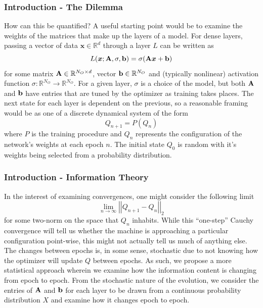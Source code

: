 \documentclass[11pt,aspectratio=169]{beamer}
\newcommand{\norm}[1]{\left|\left|#1\right|\right|}
\newcommand{\R}{\mathbb{R}}
\begin{document}
    \begin{frame}
        \frametitle{Introduction - The Dilemma}
        How can this be quantified? A useful starting point would be to examine the weights of
        the matrices that make up the layers of a model. For dense layers, passing a vector of 
        data $\boldsymbol{x} \in \R^{d}$ through a layer $L$ can be written as 
        \begin{equation}
            L(\boldsymbol{x}; {\bf A}, \sigma, {\bf b}) = \sigma({\bf A}\boldsymbol{x} + {\bf b})
        \end{equation}
        for some matrix ${\bf A} \in \R^{N_O\times d}$, vector ${\bf b} \in \R^{N_O}$ and (typically nonlinear)
        activation function $\sigma: \R^{N_O} \to \R^{N_O}$. For a given layer, $\sigma$ is a choice of the 
        model, but both ${\bf A}$ and ${\bf b}$ have entries that are tuned by the 
        optimizer as training takes places. The next state for each layer is dependent on the previous, so a reasonable 
        framing would be as one of a discrete dynamical system of the form
        \begin{equation}
            Q_{n+1} = P(Q_n)
        \end{equation}
        where $P$ is the training procedure and $Q_n$ represents the configuration of the network's
        weights at each epoch $n$. The initial state $Q_0$ is random with it's weights being
        selected from a probability distribution. 
    \end{frame}

    \begin{frame}
        \frametitle{Introduction - Information Theory}
        In the interest of examining 
        convergences, one might consider the following limit 
        \begin{equation}
            \lim_{n\to\infty} \norm{Q_{n+1} - Q_n}_2    
        \end{equation}
        for some two-norm on the space that $Q_n$ inhabits. While this ``one-step'' Cauchy 
        convergence will tell us whether the machine is approaching a particular configuration
        point-wise, this might not actually tell us much of anything else. The changes between 
        epochs is, in some sense, stochastic due to not knowing how the optimizer will update $Q$
        between epochs. As such, we propose a more statistical approach wherein we examine how the
        information content is changing from epoch to epoch. From the stochastic nature of the 
        evolution, we consider the entries of ${\bf A}$ and ${\bf b}$ for each layer to be drawn from a continuous 
        probability distribution $X$ and examine how it changes epoch to epoch.
    \end{frame}
\end{document}
